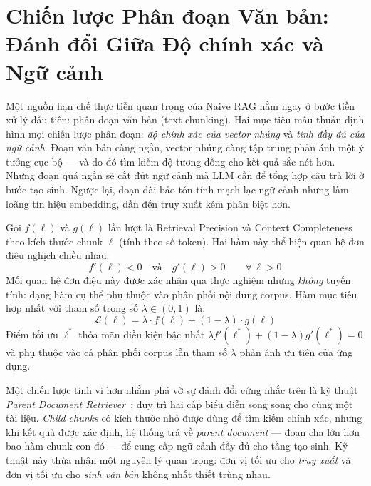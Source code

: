 \documentclass[12pt,a4paper]{report}
\theoremstyle{plain}
\theoremstyle{definition}
\begin{document}
	\section{Chiến lược Phân đoạn Văn bản: Đánh đổi Giữa Độ chính xác và Ngữ cảnh}
	\label{sec:chunking_tradeoffs}
	
	Một nguồn hạn chế thực tiễn quan trọng của Naive RAG nằm ngay ở bước tiền xử
	lý đầu tiên: phân đoạn văn bản (text chunking). Hai mục tiêu mâu thuẫn định
	hình mọi chiến lược phân đoạn: \emph{độ chính xác của vector nhúng} và
	\emph{tính đầy đủ của ngữ cảnh}. Đoạn văn bản càng ngắn, vector nhúng càng
	tập trung phản ánh một ý tưởng cục bộ --- và do đó tìm kiếm độ tương đồng cho
	kết quả sắc nét hơn. Nhưng đoạn quá ngắn sẽ cắt đứt ngữ cảnh mà LLM cần để
	tổng hợp câu trả lời ở bước tạo sinh. Ngược lại, đoạn dài bảo tồn tính mạch
	lạc ngữ cảnh nhưng làm loãng tín hiệu embedding, dẫn đến truy xuất kém phân
	biệt hơn.
	
	
	Gọi $f(\ell)$ và $g(\ell)$ lần lượt là Retrieval Precision và Context
	Completeness theo kích thước chunk $\ell$ (tính theo số token). Hai hàm này
	thể hiện quan hệ đơn điệu nghịch chiều nhau:
	\begin{equation}
		f'(\ell) < 0
		\quad\text{và}\quad
		g'(\ell) > 0
		\qquad \forall\,\ell > 0
		\label{eq:chunking_monotone}
	\end{equation}
	Mối quan hệ đơn điệu này được xác nhận qua thực nghiệm nhưng \emph{không}
	tuyến tính: dạng hàm cụ thể phụ thuộc vào phân phối nội dung corpus. Hàm
	mục tiêu hợp nhất với tham số trọng số $\lambda \in (0,1)$ là:
	\begin{equation}
		\mathcal{L}(\ell)
		= \lambda \cdot f(\ell) + (1-\lambda) \cdot g(\ell)
		\label{eq:chunking_objective}
	\end{equation}
	Điểm tối ưu $\ell^*$ thỏa mãn điều kiện bậc nhất
	$\lambda f'(\ell^*) + (1-\lambda)g'(\ell^*) = 0$ và phụ thuộc vào cả phân
	phối corpus lẫn tham số $\lambda$ phản ánh ưu tiên của ứng dụng.
	
	Một chiến lược tinh vi hơn nhằm phá vỡ sự đánh đổi cứng nhắc trên là kỹ thuật
	\emph{Parent Document Retriever}~\cite{neo4j2024essential}: duy trì hai cấp biểu
	diễn song song cho cùng một tài liệu. \emph{Child chunks} có kích thước nhỏ
	được dùng để tìm kiếm chính xác, nhưng khi kết quả được xác định, hệ thống trả
	về \emph{parent document} --- đoạn cha lớn hơn bao hàm chunk con đó --- để cung
	cấp ngữ cảnh đầy đủ cho tầng tạo sinh. Kỹ thuật này thừa nhận một nguyên lý
	quan trọng: đơn vị tối ưu cho \emph{truy xuất} và đơn vị tối ưu cho \emph{sinh
		văn bản} không nhất thiết trùng nhau.
	
\end{document}
